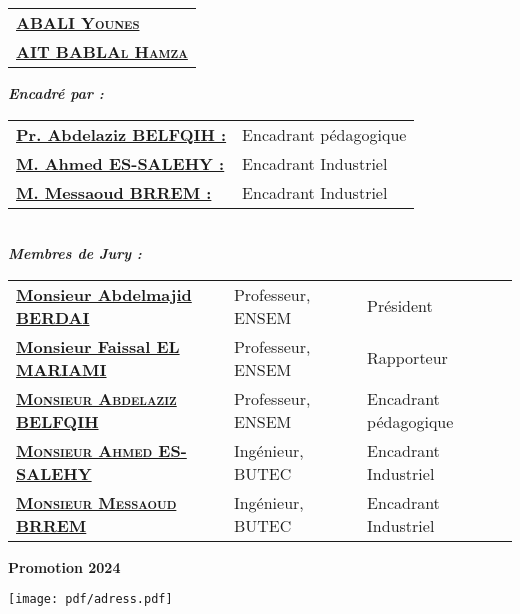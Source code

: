 \begin{titlepage}
\begin{minipage}[t]{0.3\textwidth}
\begin{tabular}{>{\bfseries}l}
				\textsc{\href{https://www.linkedin.com/in/abali-younes/}{ABALI Younes}} \\
				\textsc{\href{https://www.linkedin.com/in/hamza-ait-bablal-51a006240/}{AIT BABLAl Hamza}}  
			\end{tabular}
		\end{minipage}
		\hfill
		\begin{minipage}[t]{0.6\textwidth}
			\textbf{\emph{Encadré par :}} \\
			\begin{tabular}{>{\bfseries}ll}
				\href{https://www.researchgate.net/scientific-contributions/Abdelaziz-Belfqih-2246163687}{Pr. Abdelaziz BELFQIH :}  & Encadrant pédagogique\\
				\href{https://ma.linkedin.com/in/ahmed-essalehy-47aa8121a}{M. Ahmed ES-SALEHY : }   & Encadrant Industriel \\
				\href{https://ma.linkedin.com/in/messaoud-brrem-39992558}{M. Messaoud BRREM    : }   & Encadrant Industriel
			\end{tabular}
		\end{minipage}\\
	
	\vfill
	\textbf{\emph{Membres de Jury :}} \\
	\begin{tabular}{>{\bfseries}lll}
		\textbf{\href{https://www.researchgate.net/profile/Berdai-Abdelmajid}{Monsieur Abdelmajid BERDAI }} &Professeur, ENSEM&Président\\
		\textbf{\href{https://www.researchgate.net/profile/Elmariami-Faissal}{Monsieur Faissal EL MARIAMI}}&Professeur, ENSEM&Rapporteur\\
		 \textsc{\href{https://www.researchgate.net/scientific-contributions/Abdelaziz-Belfqih-2246163687}{Monsieur Abdelaziz BELFQIH }}&Professeur, ENSEM&Encadrant pédagogique\\
		\textsc{\href{https://ma.linkedin.com/in/ahmed-essalehy-47aa8121a}{Monsieur Ahmed ES-SALEHY }}&Ingénieur, BUTEC &Encadrant Industriel\\
		\textsc{\href{https://ma.linkedin.com/in/messaoud-brrem-39992558}{Monsieur Messaoud BRREM }} &Ingénieur, BUTEC &Encadrant Industriel\\
	\end{tabular}
	\vfill
	\begin{flushright}
		
		\vspace{-0.1in}\textbf{Promotion 2024}\vspace{-0.1in}\\
		
	\end{flushright}
	\begin{center}
		
		\texttt{[image: pdf/adress.pdf]}
	\end{center}

	\newpage
	\thispagestyle{empty}
\end{titlepage}

